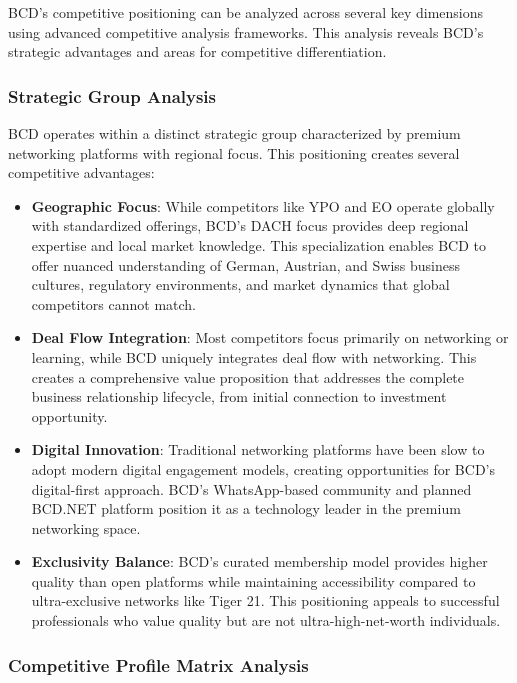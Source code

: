 BCD's competitive positioning can be analyzed across several key dimensions using advanced competitive analysis frameworks. This analysis reveals BCD's strategic advantages and areas for competitive differentiation.

\subsubsection{Strategic Group Analysis}

BCD operates within a distinct strategic group characterized by premium networking platforms with regional focus. This positioning creates several competitive advantages:

\begin{itemize}
    \item \textbf{Geographic Focus}: While competitors like YPO and EO operate globally with standardized offerings, BCD's DACH focus provides deep regional expertise and local market knowledge. This specialization enables BCD to offer nuanced understanding of German, Austrian, and Swiss business cultures, regulatory environments, and market dynamics that global competitors cannot match.
    
    \item \textbf{Deal Flow Integration}: Most competitors focus primarily on networking or learning, while BCD uniquely integrates deal flow with networking. This creates a comprehensive value proposition that addresses the complete business relationship lifecycle, from initial connection to investment opportunity.
    
    \item \textbf{Digital Innovation}: Traditional networking platforms have been slow to adopt modern digital engagement models, creating opportunities for BCD's digital-first approach. BCD's WhatsApp-based community and planned BCD.NET platform position it as a technology leader in the premium networking space.
    
    \item \textbf{Exclusivity Balance}: BCD's curated membership model provides higher quality than open platforms while maintaining accessibility compared to ultra-exclusive networks like Tiger 21. This positioning appeals to successful professionals who value quality but are not ultra-high-net-worth individuals.
\end{itemize}

\subsubsection{Competitive Profile Matrix Analysis}

